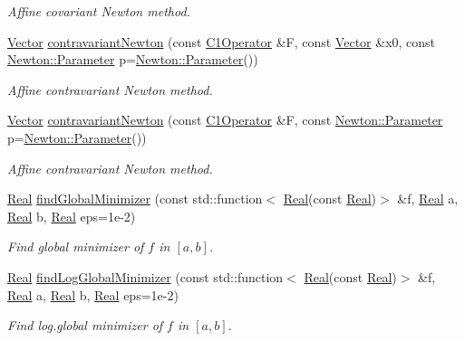 \begin{DoxyCompactItemize}
\begin{DoxyCompactList}\small\item\em Affine covariant Newton method. \end{DoxyCompactList}\item 
\hyperlink{classSpacy_1_1Vector}{Vector} \hyperlink{group__NewtonGroup_ga323071fce88ea5e655bb18fb4233101c}{contravariant\+Newton} (const \hyperlink{classSpacy_1_1C1Operator}{C1\+Operator} \&F, const \hyperlink{classSpacy_1_1Vector}{Vector} \&x0, const \hyperlink{structSpacy_1_1Newton_1_1Parameter}{Newton\+::\+Parameter} p=\hyperlink{structSpacy_1_1Newton_1_1Parameter}{Newton\+::\+Parameter}())
\begin{DoxyCompactList}\small\item\em Affine contravariant Newton method. \end{DoxyCompactList}\item 
\hyperlink{classSpacy_1_1Vector}{Vector} \hyperlink{group__NewtonGroup_ga8cde4ccdf9479141f8f8b92607f0f724}{contravariant\+Newton} (const \hyperlink{classSpacy_1_1C1Operator}{C1\+Operator} \&F, const \hyperlink{structSpacy_1_1Newton_1_1Parameter}{Newton\+::\+Parameter} p=\hyperlink{structSpacy_1_1Newton_1_1Parameter}{Newton\+::\+Parameter}())
\begin{DoxyCompactList}\small\item\em Affine contravariant Newton method. \end{DoxyCompactList}\item 
\hyperlink{classSpacy_1_1Real}{Real} \hyperlink{namespaceSpacy_ae9be0a4a666a16ff296b87454f36956f}{find\+Global\+Minimizer} (const std\+::function$<$ \hyperlink{classSpacy_1_1Real}{Real}(const \hyperlink{classSpacy_1_1Real}{Real})$>$ \&f, \hyperlink{classSpacy_1_1Real}{Real} a, \hyperlink{classSpacy_1_1Real}{Real} b, \hyperlink{classSpacy_1_1Real}{Real} eps=1e-\/2)
\begin{DoxyCompactList}\small\item\em Find global minimizer of $f$ in $[a,b]$. \end{DoxyCompactList}\item 
\hyperlink{classSpacy_1_1Real}{Real} \hyperlink{namespaceSpacy_a7ab93c587f9cb9951b26a8f07209c4cf}{find\+Log\+Global\+Minimizer} (const std\+::function$<$ \hyperlink{classSpacy_1_1Real}{Real}(const \hyperlink{classSpacy_1_1Real}{Real})$>$ \&f, \hyperlink{classSpacy_1_1Real}{Real} a, \hyperlink{classSpacy_1_1Real}{Real} b, \hyperlink{classSpacy_1_1Real}{Real} eps=1e-\/2)
\begin{DoxyCompactList}\small\item\em Find log.\+global minimizer of $f$ in $[a,b]$. \end{DoxyCompactList}\item 

\end{DoxyCompactItemize}
